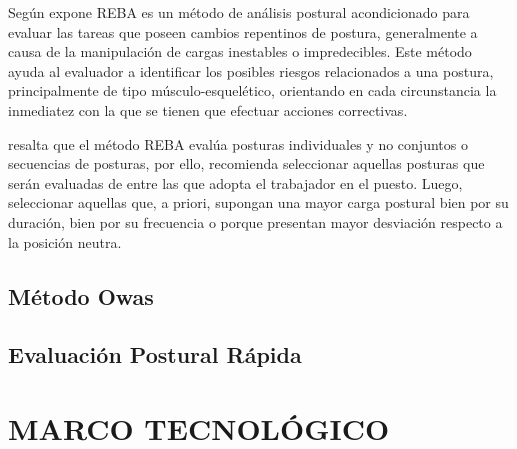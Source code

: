 Según expone \parencite{Hignett2000RapidREBA} REBA es un método de análisis postural acondicionado para evaluar las tareas que poseen cambios repentinos de postura, generalmente a causa de la manipulación de cargas inestables o impredecibles. Este método ayuda al evaluador a identificar los posibles riesgos relacionados a una postura, principalmente de tipo músculo-esquelético, orientando en cada circunstancia la inmediatez con la que se tienen que efectuar acciones correctivas.

\parencite{Diego-Mas2015EvaluacionREBA} resalta que el método REBA evalúa posturas individuales y no conjuntos o secuencias de posturas, por ello, recomienda seleccionar aquellas posturas que serán evaluadas de entre las que adopta el trabajador en el puesto. Luego, seleccionar aquellas que, a priori, supongan una mayor carga postural bien por su duración, bien por su frecuencia o porque presentan mayor desviación respecto a la posición neutra.
\subsection{Método Owas}
\subsection{Evaluación Postural Rápida}
\section{MARCO TECNOLÓGICO}